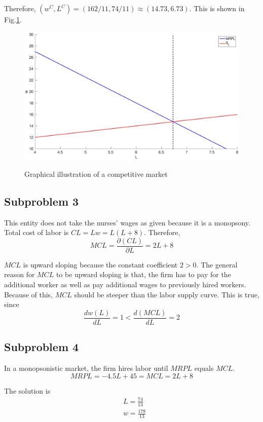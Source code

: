 \documentclass{article}
\begin{document}
Therefore, $(w^C,L^C)=(162/11,74/11)\approx(14.73,6.73)$. This is shown in Fig.\ref{fig1}. 
\begin{figure}[!htbp]
	\centering
	\includegraphics[width=12cm]{fig1.eps}\\
	\caption{Graphical illustration of a competitive market}\label{fig1}
\end{figure}

\subsection{Subproblem 3}
This entity does not take the nurses' wages as given because it is a monopsony. Total cost of labor is $CL=Lw=L(L+8)$. Therefore,
\begin{equation*}
	MCL=\frac{\partial(CL)}{\partial L}=2L+8
\end{equation*}

$MCL$ is upward sloping because the constant coefficient $2>0$. The general reason for $MCL$ to be upward sloping is that, the firm has to pay for the additional worker as well as pay additional wages to previously hired workers. Because of this, $MCL$ should be steeper than the labor supply curve. This is true, since
\begin{equation*}
	\frac{dw(L)}{dL}=1<\frac{d(MCL)}{dL}=2
\end{equation*}


\subsection{Subproblem 4}
In a monopsonistic market, the firm hires labor until $MRPL$ equals $MCL$.
\begin{equation*}
	MRPL=-4.5L+45=MCL=2L+8
\end{equation*}

The solution is
\begin{align*}
	&L=\frac{74}{13}\\
	&w=\frac{178}{13}
\end{align*}
\end{document}
